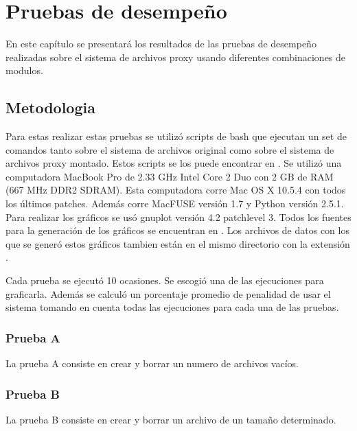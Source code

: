 \chapter{Pruebas de desempeño}
\ifpdf
    \graphicspath{{Chapter3/Chapter3Figs/PNG/}{Chapter3/Chapter3Figs/PDF/}{Chapter3/Chapter3Figs/}}
\else
    \graphicspath{{Chapter3/Chapter3Figs/EPS/}{Chapter3/Chapter3Figs/}}
\fi

En este capítulo se presentará los resultados de las pruebas de desempeño realizadas sobre el sistema de archivos proxy usando diferentes combinaciones de modulos.


\section{Metodologia}

Para estas realizar estas pruebas se utilizó scripts de bash que ejecutan un set de comandos tanto sobre el sistema de archivos original como sobre el sistema de archivos proxy montado. Estos scripts se los puede encontrar en . Se utilizó una computadora MacBook Pro de 2.33 GHz Intel Core 2 Duo con 2 GB de RAM (667 MHz DDR2 SDRAM). Esta computadora corre Mac OS X 10.5.4 con todos los últimos patches. Además corre MacFUSE versión 1.7 y Python versión 2.5.1. Para realizar los gráficos se usó gnuplot versión 4.2 patchlevel 3. Todos los fuentes para la generación de los gráficos se encuentran en . Los archivos de datos con los que se generó estos gráficos tambien están en el mismo directorio con la extensión .

Cada prueba se ejecutó 10 ocasiones. Se escogió una de las ejecuciones para graficarla. Además se calculó un porcentaje promedio de penalidad de usar el sistema tomando en cuenta todas las ejecuciones para cada una de las pruebas.

\subsection{Prueba A}

La prueba A consiste en crear y borrar un numero de archivos vacíos.

\subsection{Prueba B}

La prueba B consiste en crear y borrar un archivo de un tamaño determinado.


